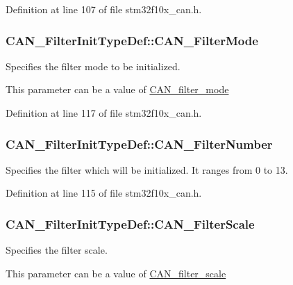 Definition at line 107 of file stm32f10x\-\_\-can.\-h.

\hypertarget{struct_c_a_n___filter_init_type_def_a7cfb23c48aad13a058c2619dbc062d8a}{
\subsubsection[{C\-A\-N\-\_\-\-Filter\-Mode}]{ C\-A\-N\-\_\-\-Filter\-Init\-Type\-Def\-::\-C\-A\-N\-\_\-\-Filter\-Mode}}\label{struct_c_a_n___filter_init_type_def_a7cfb23c48aad13a058c2619dbc062d8a}
\begin{DoxyVerb}                Specifies the filter mode to be initialized.
\end{DoxyVerb}
 This parameter can be a value of \hyperlink{group___c_a_n__filter__mode}{C\-A\-N\-\_\-filter\-\_\-mode} 

Definition at line 117 of file stm32f10x\-\_\-can.\-h.

\hypertarget{struct_c_a_n___filter_init_type_def_af94466e1138c2b4fe6a67cf556981193}{
\subsubsection[{C\-A\-N\-\_\-\-Filter\-Number}]{ C\-A\-N\-\_\-\-Filter\-Init\-Type\-Def\-::\-C\-A\-N\-\_\-\-Filter\-Number}}\label{struct_c_a_n___filter_init_type_def_af94466e1138c2b4fe6a67cf556981193}
Specifies the filter which will be initialized. It ranges from 0 to 13. 

Definition at line 115 of file stm32f10x\-\_\-can.\-h.

\hypertarget{struct_c_a_n___filter_init_type_def_a9d52661aca538dbfcafdda6f16dddc82}{
\subsubsection[{C\-A\-N\-\_\-\-Filter\-Scale}]{ C\-A\-N\-\_\-\-Filter\-Init\-Type\-Def\-::\-C\-A\-N\-\_\-\-Filter\-Scale}}\label{struct_c_a_n___filter_init_type_def_a9d52661aca538dbfcafdda6f16dddc82}
\begin{DoxyVerb}               Specifies the filter scale.
\end{DoxyVerb}
 This parameter can be a value of \hyperlink{group___c_a_n__filter__scale}{C\-A\-N\-\_\-filter\-\_\-scale} 

